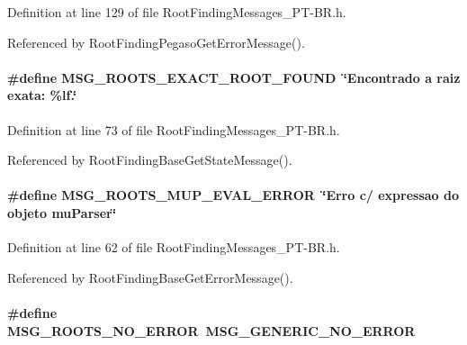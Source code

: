 Definition at line 129 of file RootFindingMessages\_\-PT-BR.h.

Referenced by RootFindingPegasoGetErrorMessage().\hypertarget{group____messages_gb6dcd48efc265c326e568344c2040775}{
\paragraph[MSG\_\-ROOTS\_\-EXACT\_\-ROOT\_\-FOUND]{\setlength{\rightskip}{0pt plus 5cm}\#define MSG\_\-ROOTS\_\-EXACT\_\-ROOT\_\-FOUND~\char`\"{}Encontrado a raiz exata: \%lf.\char`\"{}}\hfill}
\label{group____messages_gb6dcd48efc265c326e568344c2040775}




Definition at line 73 of file RootFindingMessages\_\-PT-BR.h.

Referenced by RootFindingBaseGetStateMessage().\hypertarget{group____messages_g4c5e1f67fc078b0bb717e112d9ecad23}{
\paragraph[MSG\_\-ROOTS\_\-MUP\_\-EVAL\_\-ERROR]{\setlength{\rightskip}{0pt plus 5cm}\#define MSG\_\-ROOTS\_\-MUP\_\-EVAL\_\-ERROR~\char`\"{}Erro c/ expressao do objeto muParser\char`\"{}}\hfill}
\label{group____messages_g4c5e1f67fc078b0bb717e112d9ecad23}




Definition at line 62 of file RootFindingMessages\_\-PT-BR.h.

Referenced by RootFindingBaseGetErrorMessage().\hypertarget{group____messages_g8ccd3ef3d66c52d9a2f5c56b7c62e837}{
\paragraph[MSG\_\-ROOTS\_\-NO\_\-ERROR]{\setlength{\rightskip}{0pt plus 5cm}\#define MSG\_\-ROOTS\_\-NO\_\-ERROR~MSG\_\-GENERIC\_\-NO\_\-ERROR}\hfill}
\label{group____messages_g8ccd3ef3d66c52d9a2f5c56b7c62e837}




